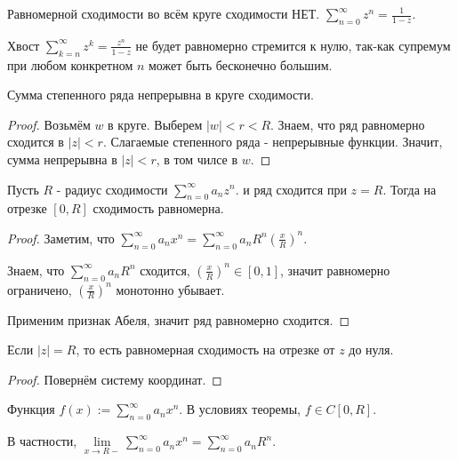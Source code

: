 \begin{remark} \thmslashn

    Равномерной сходимости во всём круге сходимости НЕТ. $\sum\limits_{n=0}^{\infty} z^{n} = \frac{1}{1-z}$.

    Хвост $\sum\limits_{k=n}^{\infty} z^{k} = \frac{z^{n}}{1-z}$ не будет равномерно стремится к нулю, так-как супремум при любом конкретном $n$ может быть бесконечно большим.
\end{remark}
\begin{consequence} \thmslashn

    Сумма степенного ряда непрерывна в круге сходимости.
    \begin{proof} \thmslashn
    
        Возьмём $w$ в круге. Выберем $|w| < r < R$. Знаем, что ряд равномерно сходится в $|z| < r$. Слагаемые степенного ряда - непрерывные функции. Значит, сумма непрерывна в $|z| < r$, в том чилсе в  $w$.
    \end{proof}
\end{consequence}
\begin{theorem} \thmslashn

    Пусть $R$ - радиус сходимости $\sum\limits_{n=0}^{\infty} a_{n}z^{n}$. и ряд сходится при $z=R$. Тогда на отрезке $[0, R]$ сходимость равномерна.
    \begin{proof} \thmslashn
    
        Заметим, что $\sum\limits_{n=0}^{\infty} a_{n}x^{n} = \sum\limits_{n=0}^{\infty} a_{n}R^{n}\left( \frac{x}{R} \right)^{n}$.

        Знаем, что $\sum\limits_{n=0}^{\infty} a_{n}R^{n}$ сходится, $\left( \frac{x}{R} \right)^{n}\in [0, 1]$, значит равномерно ограничено, $\left( \frac{x}{R} \right)^{n} $ монотонно убывает.

        Применим признак Абеля, значит ряд равномерно сходится.
    \end{proof}
\end{theorem}
\begin{remark} \thmslashn

    Если $|z| = R$, то есть равномерная сходимость на отрезке от $z$ до нуля.
    \begin{proof} \thmslashn
    
        Повернём систему координат.
    \end{proof}
\end{remark}
\begin{consequence} \thmslashn

    Функция $f(x) := \sum\limits_{n=0}^{\infty} a_{n}x^{n}$. В условиях теоремы, $f\in C[0, R]$. 

    В частности, $\lim\limits_{x \to R-} \sum\limits_{n=0}^{\infty} a_{n}x^{n} = \sum\limits_{n=0}^{\infty} a_{n}R^{n}$.
\end{consequence}

